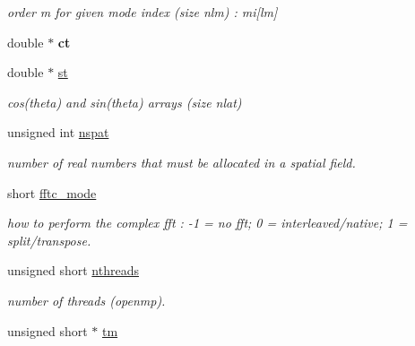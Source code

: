 \begin{DoxyCompactItemize}
\begin{DoxyCompactList}\small\item\em order m for given mode index (size nlm) \+: mi\mbox{[}lm\mbox{]} \end{DoxyCompactList}\item 
\hypertarget{structshtns__info_aef3d64ca3ab3db540077bd2e15c88f8f}{}double $\ast$ {\bfseries ct}\label{structshtns__info_aef3d64ca3ab3db540077bd2e15c88f8f}

\item 
\hypertarget{structshtns__info_a609589277af64939f7011b669147617b}{}double $\ast$ \hyperlink{structshtns__info_a609589277af64939f7011b669147617b}{st}\label{structshtns__info_a609589277af64939f7011b669147617b}

\begin{DoxyCompactList}\small\item\em cos(theta) and sin(theta) arrays (size nlat) \end{DoxyCompactList}\item 
\hypertarget{structshtns__info_aed9bef40a200b6930120b84fa130c41a}{}unsigned int \hyperlink{structshtns__info_aed9bef40a200b6930120b84fa130c41a}{nspat}\label{structshtns__info_aed9bef40a200b6930120b84fa130c41a}

\begin{DoxyCompactList}\small\item\em number of real numbers that must be allocated in a spatial field. \end{DoxyCompactList}\item 
\hypertarget{structshtns__info_a2b76f5aee91ca7a93387d087ece0fd99}{}short \hyperlink{structshtns__info_a2b76f5aee91ca7a93387d087ece0fd99}{fftc\+\_\+mode}\label{structshtns__info_a2b76f5aee91ca7a93387d087ece0fd99}

\begin{DoxyCompactList}\small\item\em how to perform the complex fft \+: -\/1 = no fft; 0 = interleaved/native; 1 = split/transpose. \end{DoxyCompactList}\item 
\hypertarget{structshtns__info_a15f3351973710815ee68d0369e48dc43}{}unsigned short \hyperlink{structshtns__info_a15f3351973710815ee68d0369e48dc43}{nthreads}\label{structshtns__info_a15f3351973710815ee68d0369e48dc43}

\begin{DoxyCompactList}\small\item\em number of threads (openmp). \end{DoxyCompactList}\item 
\hypertarget{structshtns__info_a6e82a42d5e69391830bf5d7f085333f7}{}unsigned short $\ast$ \hyperlink{structshtns__info_a6e82a42d5e69391830bf5d7f085333f7}{tm}\label{structshtns__info_a6e82a42d5e69391830bf5d7f085333f7}


\end{DoxyCompactItemize}
